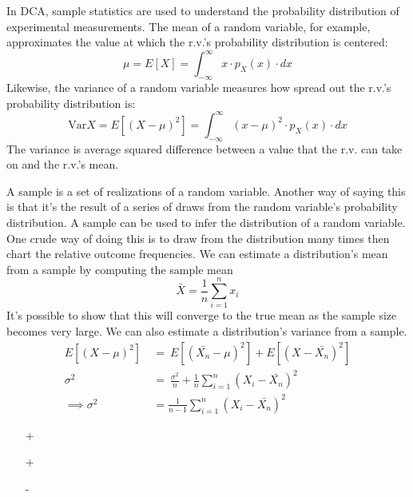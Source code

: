 \documentclass[11pt,a4paper,article]{memoir} %
\begin{document}
 \par
In DCA, sample statistics are used to understand the probability distribution of experimental measurements. The mean of a random variable, for example, approximates the value at which the r.v.'s probability distribution is centered:
\[
	\mu = E[X] = \int_{-\infty}^{\infty}x\cdot p_X(x) \cdot dx
\]
Likewise, the variance of a random variable measures how spread out the r.v.'s probability distribution is:
\[
	\text{Var}X = E[(X - \mu)^2] = \int_{-\infty}^{\infty}(x - \mu)^2 \cdot p_X(x)\cdot dx
\]
The variance is average squared difference between a value that the r.v. can take on and the r.v.'s mean.
\par
A sample is a set of realizations of a random variable. Another way of saying this is that it's the result of a series of draws from the random variable's probability distribution. A sample can be used to infer the distribution of a random variable. One crude way of doing this is to draw from the distribution many times then chart the relative outcome frequencies. We can estimate a distribution's mean from a sample by computing the sample mean
\[
	\bar{X} = \frac{1}{n}\sum_{i = 1}^{n}x_i 
\]
It's possible to show that this will converge to the true mean as the sample size becomes very large. 
We can also estimate a distribution's variance from a sample. 
\begin{align}
	E[(X - \mu)^2] \ &= \ E[(\bar{X_n} - \mu)^2] + E[(X - \bar{X_n})^2]\\
	\sigma^2 \ &= \ \frac{\sigma^2}{n} +  \frac{1}{n}\sum_{i = 1}^n (X_i - \bar{X_n})^2 \\
	\implies \sigma^2 &= \frac{1}{n - 1}\sum_{i = 1}^{n}(X_i - \bar{X_n})^2
\end{align}
\begin{itemize}
\item[+]
\item[+]
\item[-]
\end{itemize}
\end{document}

